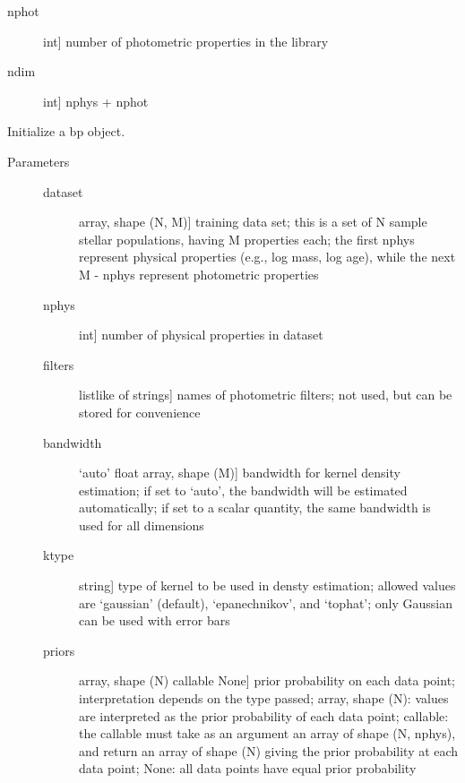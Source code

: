 \documentclass[letterpaper,10pt,english]{sphinxmanual}
\begin{document}
\begin{fulllineitems}
\begin{description}
\begin{description}
\item[{nphot}] \leavevmode{[}int{]}
number of photometric properties in the library

\item[{ndim}] \leavevmode{[}int{]}
nphys + nphot

\end{description}

\end{description}

\begin{fulllineitems}
\label{\detokenize{bayesphot:slugpy.bayesphot.bp.bp.__init__}}
Initialize a bp object.
\begin{description}
\item[{Parameters}] \leavevmode\begin{description}
\item[{dataset}] \leavevmode{[}array, shape (N, M){]}
training data set; this is a set of N sample stellar
populations, having M properties each; the first nphys
represent physical properties (e.g., log mass, log age),
while the next M - nphys represent photometric
properties

\item[{nphys}] \leavevmode{[}int{]}
number of physical properties in dataset

\item[{filters}] \leavevmode{[}listlike of strings{]}
names of photometric filters; not used, but can be
stored for convenience

\item[{bandwidth}] \leavevmode{[}‘auto’ \textbar{} float \textbar{} array, shape (M){]}
bandwidth for kernel density estimation; if set to
‘auto’, the bandwidth will be estimated automatically; if
set to a scalar quantity, the same bandwidth is used for all
dimensions

\item[{ktype}] \leavevmode{[}string{]}
type of kernel to be used in densty estimation; allowed
values are ‘gaussian’ (default), ‘epanechnikov’, and
‘tophat’; only Gaussian can be used with error bars

\item[{priors}] \leavevmode{[}array, shape (N) \textbar{} callable \textbar{} None{]}
prior probability on each data point; interpretation
depends on the type passed; array, shape (N): values are
interpreted as the prior probability of each data point;
callable: the callable must take as an argument an array
of shape (N, nphys), and return an array of shape (N)
giving the prior probability at each data point; None:
all data points have equal prior probability


\end{description}
\end{description}
\end{fulllineitems}
\end{fulllineitems}
\end{document}
